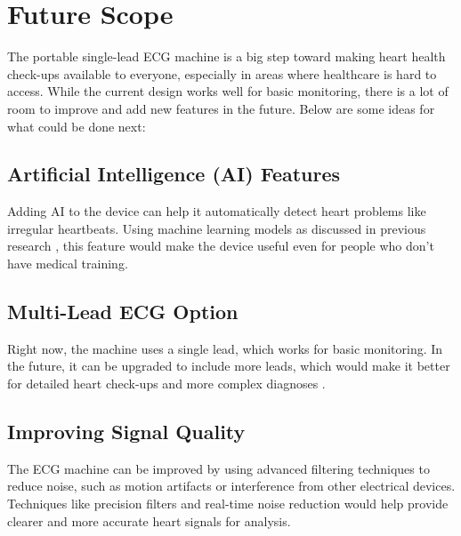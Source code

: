 \chapter{Future Scope}

The portable single-lead ECG machine is a big step toward making heart health check-ups available to everyone, especially in areas where healthcare is hard to access. While the current design works well for basic monitoring, there is a lot of room to improve and add new features in the future. Below are some ideas for what could be done next:

\section{Artificial Intelligence (AI) Features}
Adding AI to the device can help it automatically detect heart problems like irregular heartbeats. Using machine learning models as discussed in previous research \cite{Kiani2018}, this feature would make the device useful even for people who don’t have medical training.

\section{Multi-Lead ECG Option}
Right now, the machine uses a single lead, which works for basic monitoring. In the future, it can be upgraded to include more leads, which would make it better for detailed heart check-ups and more complex diagnoses \cite{Arias2016}.


\section{Improving Signal Quality}
The ECG machine can be improved by using advanced filtering techniques to reduce noise, such as motion artifacts or interference from other electrical devices. Techniques like precision filters and real-time noise reduction \cite{Tayal2018} would help provide clearer and more accurate heart signals for analysis.

